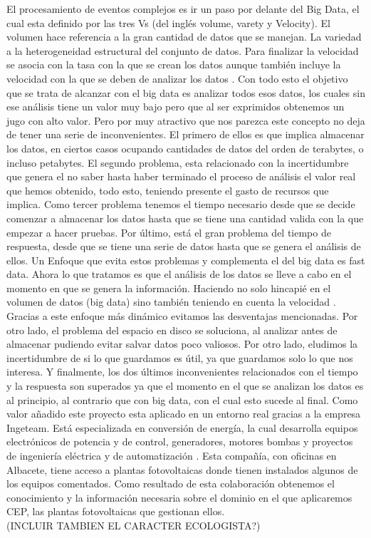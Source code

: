 \documentclass[spanish,twoside,openright,12pt,a4paper]{book}
\begin{document}
El procesamiento de eventos complejos es ir un paso por delante del Big Data, el cual esta definido por las tres Vs (del inglés volume, varety y Velocity). El volumen hace referencia a la gran cantidad de datos que se manejan. La variedad a la heterogeneidad estructural del conjunto de datos. Para finalizar la velocidad se asocia con la tasa con la que se crean los datos aunque también incluye la velocidad con la que se deben de analizar los datos \cite{GANDOMI2015137}. Con todo esto el objetivo que se trata de alcanzar con el big data es analizar todos esos datos, los cuales sin ese análisis tiene un valor muy bajo pero que al ser exprimidos obtenemos un jugo con alto valor. Pero por muy atractivo que nos parezca este concepto no deja de tener una serie de inconvenientes. El primero de ellos es que implica almacenar los datos, en ciertos casos ocupando cantidades de datos del orden de terabytes, o incluso petabytes. El segundo problema, esta relacionado con la incertidumbre que genera el no saber hasta haber terminado el proceso de análisis el valor real que hemos obtenido, todo esto, teniendo presente el gasto de recursos que implica. Como tercer problema tenemos el tiempo necesario desde que se decide comenzar a almacenar los datos hasta que se tiene una cantidad valida con la que empezar a hacer pruebas. Por último, está el gran problema del tiempo de respuesta, desde que se tiene una serie de datos hasta que se genera el análisis de ellos.
Un Enfoque que evita estos problemas y complementa el del big data es fast data. Ahora lo que tratamos es que el análisis de los datos se lleve a cabo en el momento en que se genera la información. Haciendo no solo hincapié en el volumen de datos (big data) sino también teniendo en cuenta la velocidad \cite{Mishne:2013:FDE:2463676.2465290}. Gracias a este enfoque más dinámico evitamos las desventajas mencionadas. Por otro lado, el problema del espacio en disco se soluciona, al analizar antes de almacenar pudiendo evitar salvar datos poco valiosos. Por otro lado, eludimos la incertidumbre de si lo que guardamos es útil, ya que guardamos solo lo que nos interesa. Y finalmente, los dos últimos inconvenientes relacionados con el tiempo y la respuesta son superados ya que el momento en el que se analizan los datos es al principio, al contrario que con big data, con el cual esto sucede al final.
Como valor añadido este proyecto esta aplicado en un entorno real gracias a la empresa Ingeteam. Está especializada en conversión de energía, la cual desarrolla equipos electrónicos de potencia y de control, generadores, motores bombas y proyectos de ingeniería eléctrica y de automatización \cite{webIngeteam}. Esta compañía, con oficinas en Albacete, tiene acceso a plantas fotovoltaicas donde tienen instalados algunos de los equipos comentados. Como resultado de esta colaboración obtenemos el conocimiento y la información necesaria sobre el dominio en el que aplicaremos CEP, las plantas fotovoltaicas que gestionan ellos.
\\(INCLUIR TAMBIEN EL CARACTER ECOLOGISTA?)
\end{document}
